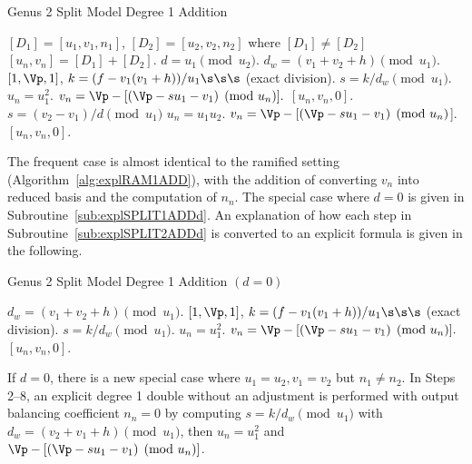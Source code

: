 \begin{algorithm}[htbp]
\caption{Genus 2 Split Model Degree 1 Addition\label{alg:explSPLIT1ADD}}
\begin{algorithmic} [1]
\Require $[D_1] = [u_1,v_1,n_1]$, $[D_2] = [u_2,v_2,n_2]$ where $[D_1] \not = [D_2]$ \smallskip
\Ensure $[u_n,v_n] = [D_1] + [D_2] $.
\algrule
\State $d = u_1 \pmod{u_2}$.
    \State $d_w = (v_1 + v_2 + h) \pmod{u_1}$.
    \State \Return $[1,\Vp,1]$,
    \Else
        \State $k = (f - v_1(v_1 + h))/u_1 \s\s\s$ (exact division).
        \State $s = k/d_w \pmod{u_1}$.
        \State $u_n = u_1^2$.
        \State $v_n = \Vp - [(\Vp - su_1 - v_1) \pmod{u_n}].$
        \State \Return $[u_n,v_n,0]$.
    \EndIf
\EndIf
\State $s = (v_2 - v_1)/d \pmod{u_1}$
\State $u_n = u_1u_2$.
\State $v_n = \Vp - [(\Vp - su_1 - v_1) \pmod{u_n}$].
\State \Return $[u_n,v_n,0]$.
\end{algorithmic}
\end{algorithm}

The frequent case is almost identical to the ramified setting
(Algorithm~\ref{alg:explRAM1ADD}), with the addition of converting $v_n$ into
reduced basis and the computation of $n_n$. The special case where $d=0$ is given
in Subroutine~\ref{sub:explSPLIT1ADDd}. An explanation of how each step in
Subroutine~\ref{sub:explSPLIT2ADDd} is converted to an explicit formula is given
in the following. 

\begin{algorithm}[htbp]
\caption{Genus 2 Split Model Degree 1 Addition $(d = 0)$ \label{sub:explSPLIT1ADDd}}
\begin{algorithmic} [1]
\State $d_w = (v_1 + v_2 + h) \pmod{u_1}$.
\State \Return $[1,\Vp,1]$,
\Else
    \State $k = (f - v_1(v_1 + h))/u_1 \s\s\s$ (exact division).
    \State $s = k/d_w \pmod{u_1}$.
    \State $u_n = u_1^2$.
    \State $v_n = \Vp - [(\Vp - su_1 - v_1) \pmod{u_n}].$
    \State \Return $[u_n,v_n,0]$.
\EndIf
\end{algorithmic}
\end{algorithm}



If $d = 0$, there is a new special case where $u_1 = u_2, v_1 = v_2$ but $n_1
\not = n_2$. In Steps 2--8, an explicit degree 1 double without an adjustment is
performed with output balancing coefficient $n_n=0$ by computing $s = k/d_w
\pmod{u_1}$ with $d_w = (v_2 + v_1 + h) \pmod{u_1}$, then $u_n = u_1^2$ and $\Vp
- [(\Vp - su_1 - v_1) \pmod{u_n}]$. 


